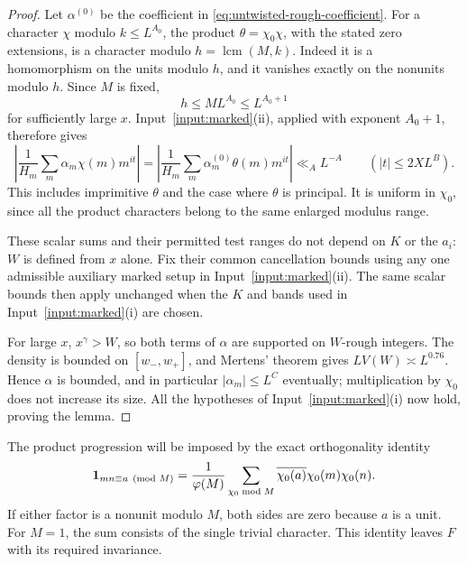 \begin{proof}
Let \(\alpha^{(0)}\) be the coefficient in
\eqref{eq:untwisted-rough-coefficient}.  For a character \(\chi\) modulo
\(k\le L^{A_0}\), the product \(\theta=\chi_0\chi\), with the stated
zero extensions, is a character modulo \(h=\operatorname{lcm}(M,k)\).
Indeed it is a homomorphism on the units modulo \(h\), and it vanishes
exactly on the nonunits modulo \(h\).  Since \(M\) is fixed,
\[
 h\le ML^{A_0}\le L^{A_0+1}
\]
for sufficiently large \(x\).  Input~\ref{input:marked}(ii), applied with
exponent \(A_0+1\), therefore gives
\[
 \left|\frac1{H_m}\sum_m\alpha_m\chi(m)m^{it}\right|
 =\left|\frac1{H_m}\sum_m\alpha_m^{(0)}\theta(m)m^{it}\right|
 \ll_A L^{-A}
 \qquad(|t|\le2XL^B).
\]
This includes imprimitive \(\theta\) and the case where \(\theta\) is
principal.  It is uniform in \(\chi_0\), since all the product characters
belong to the same enlarged modulus range.

These scalar sums and their permitted test ranges do not depend on \(K\)
or the \(a_i\): \(W\) is defined from \(x\) alone.  Fix their common
cancellation bounds using any one admissible auxiliary marked setup in
Input~\ref{input:marked}(ii).  The same scalar bounds then apply unchanged when
the \(K\) and bands used in Input~\ref{input:marked}(i) are chosen.

For large \(x\), \(x^\gamma>W\), so both terms of \(\alpha\) are supported
on \(W\)-rough integers.  The density is bounded on \([w_-,w_+]\), and
Mertens' theorem gives \(LV(W)\asymp L^{0.76}\).  Hence \(\alpha\) is
bounded, and in particular \(|\alpha_m|\le L^C\) eventually; multiplication
by \(\chi_0\) does not increase its size.  All the hypotheses of
Input~\ref{input:marked}(i) now hold, proving the lemma.
\end{proof}

The product progression will be imposed by the exact orthogonality identity
\begin{equation}\label{eq:product-progression}
 \mathbf 1_{mn\equiv a\pmod M}
 =\frac1{\varphi(M)}\sum_{\chi_0\bmod M}
       \overline{\chi_0(a)}\chi_0(m)\chi_0(n).
\end{equation}
If either factor is a nonunit modulo \(M\), both sides are zero because
\(a\) is a unit.  For \(M=1\), the sum consists of the single trivial
character.  This identity leaves \(F\) with its required invariance.


